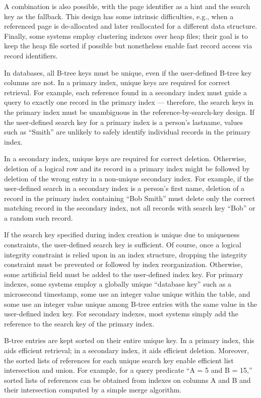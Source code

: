 A combination is also possible, with the page identifier as a hint and
the search key as the fallback. This design has some intrinsic
difficulties, e.g., when a referenced page is de-allocated and later
reallocated for a different data structure. Finally, some systems employ
clustering indexes over heap files; their goal is to keep the heap file
sorted if possible but nonetheless enable fast record access via record
identifiers.

In databases, all B-tree keys must be unique, even if the user-defined
B-tree key columns are not. In a primary index, unique keys are required
for correct retrieval. For example, each reference found in a secondary
index must guide a query to exactly one record in the primary index ---
therefore, the search keys in the primary index must be unambiguous in
the reference-by-search-key design. If the user-defined search key for a
primary index is a person's lastname, values such as ``Smith'' are unlikely
to safely identify individual records in the primary index.

In a secondary index, unique keys are required for correct deletion.
Otherwise, deletion of a logical row and its record in a primary index
might be followed by deletion of the wrong entry in a non-unique
secondary index. For example, if the user-defined search in a secondary
index is a person's first name, deletion of a record in the primary
index containing ``Bob Smith'' must delete only the correct matching
record in the secondary index, not all records with search key ``Bob''
or a random such record.

If the search key specified during index creation is unique due to
uniqueness constraints, the user-defined search key is sufficient. Of
course, once a logical integrity constraint is relied upon in an index
structure, dropping the integrity constraint must be prevented or
followed by index reorganization. Otherwise, some artificial field must
be added to the user-defined index key. For primary indexes, some
systems employ a globally unique ``database key'' such as a microsecond
timestamp, some use an integer value unique within the table, and some
use an integer value unique among B-tree entries with the same value in
the user-defined index key. For secondary indexes, most systems simply
add the reference to the search key of the primary index.

B-tree entries are kept sorted on their entire unique key. In a primary
index, this aids efficient retrieval; in a secondary index, it aids
efficient deletion. Moreover, the sorted lists of references for each
unique search key enable efficient list intersection and union. For
example, for a query predicate ``A = 5 and B = 15,'' sorted lists of
references can be obtained from indexes on columns A and B and their
intersection computed by a simple merge algorithm.

